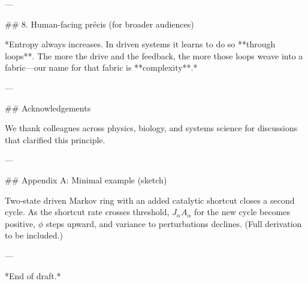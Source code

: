 ---

## 8. Human‑facing précis (for broader audiences)

*Entropy always increases. In driven systems it learns to do so **through loops**. The more the drive and the feedback, the more those loops weave into a fabric—our name for that fabric is **complexity**.*

---

## Acknowledgements

We thank colleagues across physics, biology, and systems science for discussions that clarified this principle.

---

## Appendix A: Minimal example (sketch)

Two‑state driven Markov ring with an added catalytic shortcut closes a second cycle. As the shortcut rate crosses threshold, $J_\alpha A_\alpha$ for the new cycle becomes positive, $\phi$ steps upward, and variance to perturbations declines. (Full derivation to be included.)

---

*End of draft.*
